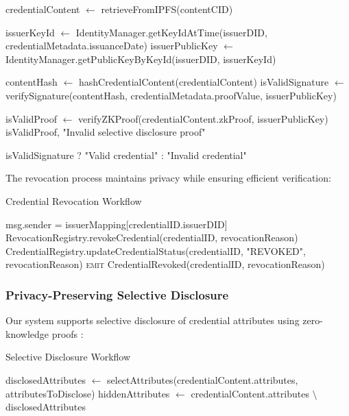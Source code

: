 \documentclass[lettersize,journal]{IEEEtran}
\begin{document}
\begin{itemize}
\begin{algorithm}[H]
\begin{algorithmic}[1]
\State {}
\State credentialContent $\gets$ retrieveFromIPFS(contentCID)

\State {}
\State issuerKeyId $\gets$ IdentityManager.getKeyIdAtTime(issuerDID, credentialMetadata.issuanceDate)
\State issuerPublicKey $\gets$ IdentityManager.getPublicKeyByKeyId(issuerDID, issuerKeyId)

\State {}
\State contentHash $\gets$ hashCredentialContent(credentialContent)
\State isValidSignature $\gets$ verifySignature(contentHash, credentialMetadata.proofValue, issuerPublicKey)

\State {}
\State isValidProof $\gets$ verifyZKProof(credentialContent.zkProof, issuerPublicKey)
\State \Require isValidProof, "Invalid selective disclosure proof"
\EndIf

\RETURN isValidSignature ? "Valid credential" : "Invalid credential"
\end{algorithmic}
\end{algorithm}

The revocation process maintains privacy while ensuring efficient verification:

\begin{algorithm}[H]
\caption{Credential Revocation Workflow}
\begin{algorithmic}[1]
    \Require msg.sender = issuerMapping[credentialID.issuerDID]
    \State RevocationRegistry.revokeCredential(credentialID, revocationReason)
    \State CredentialRegistry.updateCredentialStatus(credentialID, "REVOKED", revocationReason)
    \State \textsc{emit} CredentialRevoked(credentialID, revocationReason)
\EndProcedure
\end{algorithmic}
\end{algorithm}

\subsubsection{Privacy-Preserving Selective Disclosure}
Our system supports selective disclosure of credential attributes using zero-knowledge proofs \cite{ZKP2023}:

\begin{algorithm}[H]
\caption{Selective Disclosure Workflow}
\begin{algorithmic}[1]
\State {}
\State disclosedAttributes $\gets$ selectAttributes(credentialContent.attributes, attributesToDisclose)
\State hiddenAttributes $\gets$ credentialContent.attributes $\setminus$ disclosedAttributes


\end{algorithmic}
\end{algorithm}
\end{itemize}
\end{document}
